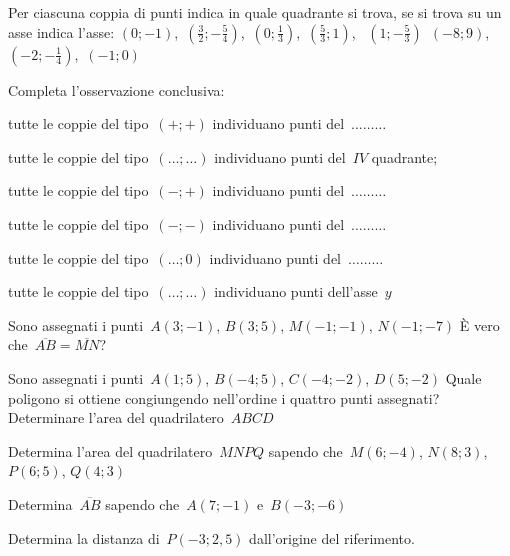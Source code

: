 \begin{esercizio}
\label{ese:D.18}
Per ciascuna coppia di punti indica in quale quadrante si trova, se si trova su un asse indica l'asse:
$(0;-1)$, \,$\left(\frac{3}{2};-\frac{5}{4}\right)$, \,$\left(0;\frac{1}{3}\right)$, \,$\left(\frac{5}{3};1\right)$, \,
$\left(1;-\frac{5}{3}\right)$ \,$(-8;9)$, \,$\left(-2;-\frac{1}{4}\right)$, \,$(-1;0)$

Completa l'osservazione conclusiva:
\begin{itemize*}
\item tutte le coppie del tipo~$(+;+)$ individuano punti del~$\ldots \ldots \ldots$
\item tutte le coppie del tipo~$(\ldots;\ldots)$ individuano punti del~$IV$ quadrante;
\item tutte le coppie del tipo~$(-;+)$ individuano punti del~$\ldots \ldots \ldots$
\item tutte le coppie del tipo~$(-;-)$ individuano punti del~$\ldots \ldots \ldots$
\item tutte le coppie del tipo~$(\ldots;0)$ individuano punti del~$\ldots \ldots \ldots$
\item tutte le coppie del tipo~$(\ldots;\ldots)$ individuano punti dell'asse~$y$
\end{itemize*}
\end{esercizio}

\begin{esercizio}
\label{ese:D.19}
Sono assegnati i punti~$A(3;-1)$, $B(3;5)$, $M(-1;-1)$, $N(-1;-7)$ È vero che~$\overline{AB}=\overline{MN}$?
\end{esercizio}

\begin{esercizio}
\label{ese:D.20}
Sono assegnati i punti~$A(1;5)$, $B(-4;5)$, $C(-4;-2)$, $D(5;-2)$ Quale poligono si ottiene congiungendo nell'ordine i quattro
punti assegnati? Determinare l'area del quadrilatero~$ABCD$
\end{esercizio}

\begin{esercizio}
\label{ese:D.21}
Determina l'area del quadrilatero~$MNPQ$ sapendo che~$M(6;-4)$, $N(8;3)$, $P(6;5)$, $Q(4;3)$
\end{esercizio}

\begin{esercizio}
\label{ese:D.22}
Determina~$\overline{AB}$ sapendo che~$A(7;-1)$ e~$B(-3;-6)$
\end{esercizio}

\begin{esercizio}
\label{ese:D.23}
Determina la distanza di~$P\left(-3;2,5\right)$ dall'origine del riferimento.
\end{esercizio}

